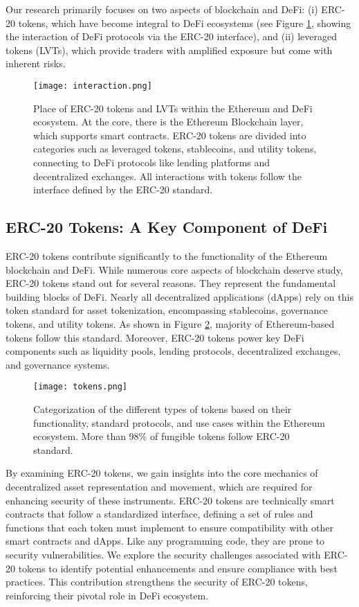 Our research primarily focuses on two aspects of blockchain and DeFi: (i) ERC-20 tokens, which have become integral to DeFi ecosystems (see Figure \ref{fig:interaction}, showing the interaction of DeFi protocols via the ERC-20 interface), and (ii) leveraged tokens (LVTs), which provide traders with amplified exposure but come with inherent risks.

\begin{figure}[t]
	\centering
	\texttt{[image: interaction.png]}
	\caption[The Ethereum and DeFi ecosystem]{Place of ERC-20 tokens and LVTs within the Ethereum and DeFi ecosystem. At the core, there is the Ethereum Blockchain layer, which supports smart contracts. ERC-20 tokens are divided into categories such as leveraged tokens, stablecoins, and utility tokens, connecting to DeFi protocols like lending platforms and decentralized exchanges. All interactions with tokens follow the interface defined by the ERC-20 standard.}
	\label{fig:interaction}
\end{figure}

\subsection{ERC-20 Tokens: A Key Component of DeFi}
ERC-20 tokens contribute significantly to the functionality of the Ethereum blockchain and DeFi. While numerous core aspects of blockchain deserve study, ERC-20 tokens stand out for several reasons. They represent the fundamental building blocks of DeFi. Nearly all decentralized applications (dApps) rely on this token standard for asset tokenization, encompassing stablecoins, governance tokens, and utility tokens. As shown in Figure \ref{fig:tokens}, majority of Ethereum-based tokens follow this standard. Moreover, ERC-20 tokens power key DeFi components such as liquidity pools, lending protocols, decentralized exchanges, and governance systems.

\begin{figure}[t]
	\centering
	\texttt{[image: tokens.png]}
	\caption[Categorization of the different types of tokens]{Categorization of the different types of tokens based on their functionality, standard protocols, and use cases within the Ethereum ecosystem. More than 98\% of fungible tokens follow ERC-20 standard.}
	\label{fig:tokens}
\end{figure}

By examining ERC-20 tokens, we gain insights into the core mechanics of decentralized asset representation and movement, which are required for enhancing security of these instruments. ERC-20 tokens are technically smart contracts that follow a standardized interface, defining a set of rules and functions that each token must implement to ensure compatibility with other smart contracts and dApps. Like any programming code, they are prone to security vulnerabilities. We explore the security challenges associated with ERC-20 tokens to identify potential enhancements and ensure compliance with best practices. This contribution strengthens the security of ERC-20 tokens, reinforcing their pivotal role in DeFi ecosystem.


